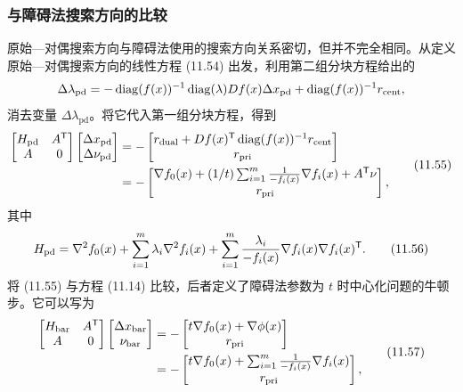 \subsubsection*{与障碍法搜索方向的比较}
原始—对偶搜索方向与障碍法使用的搜索方向关系密切，但并不完全相同。从定义原始—对偶搜索方向的线性方程 (11.54) 出发，利用第二组分块方程给出的
\[
\Delta\lambda_{\mathrm{pd}}=-\operatorname{diag}(f(x))^{-1}\operatorname{diag}(\lambda)Df(x)\Delta x_{\mathrm{pd}}
+\operatorname{diag}(f(x))^{-1}r_{\mathrm{cent}},
\]
消去变量 $\Delta\lambda_{\mathrm{pd}}$。将它代入第一组分块方程，得到
\begin{equation}\begin{aligned}
\begin{bmatrix}H_{\mathrm{pd}}&A^\mathsf T\\A&0\end{bmatrix}
\begin{bmatrix}\Delta x_{\mathrm{pd}}\\\Delta\nu_{\mathrm{pd}}\end{bmatrix}
&=-\begin{bmatrix}r_{\mathrm{dual}}+Df(x)^\mathsf T\operatorname{diag}(f(x))^{-1}r_{\mathrm{cent}}\\r_{\mathrm{pri}}\end{bmatrix}\\
&=-\begin{bmatrix}\nabla f_0(x)+(1/t)\sum_{i=1}^m\frac1{-f_i(x)}\nabla f_i(x)+A^\mathsf T\nu\\r_{\mathrm{pri}}\end{bmatrix},
\end{aligned}\tag{11.55}\end{equation}
其中
\begin{equation}
H_{\mathrm{pd}}=\nabla^2 f_0(x)+\sum_{i=1}^m\lambda_i\nabla^2 f_i(x)
+\sum_{i=1}^m\frac{\lambda_i}{-f_i(x)}\nabla f_i(x)\nabla f_i(x)^\mathsf T.\tag{11.56}
\end{equation}
将 (11.55) 与方程 (11.14) 比较，后者定义了障碍法参数为 $t$ 时中心化问题的牛顿步。它可以写为
\begin{equation}\begin{aligned}
\begin{bmatrix}H_{\mathrm{bar}}&A^\mathsf T\\A&0\end{bmatrix}
\begin{bmatrix}\Delta x_{\mathrm{bar}}\\\nu_{\mathrm{bar}}\end{bmatrix}
&=-\begin{bmatrix}t\nabla f_0(x)+\nabla\phi(x)\\r_{\mathrm{pri}}\end{bmatrix}\\
&=-\begin{bmatrix}t\nabla f_0(x)+\sum_{i=1}^m\frac1{-f_i(x)}\nabla f_i(x)\\r_{\mathrm{pri}}\end{bmatrix},
\end{aligned}\tag{11.57}\end{equation}
